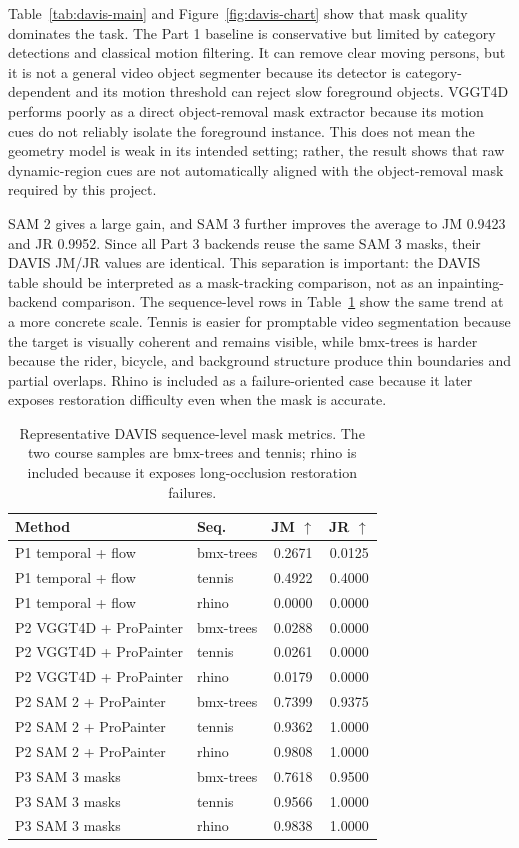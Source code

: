 \documentclass[10pt,twocolumn,letterpaper]{article}
\begin{document}
Table~\ref{tab:davis-main} and Figure~\ref{fig:davis-chart} show that mask quality dominates the task. The Part 1 baseline is conservative but limited by category detections and classical motion filtering. It can remove clear moving persons, but it is not a general video object segmenter because its detector is category-dependent and its motion threshold can reject slow foreground objects. VGGT4D performs poorly as a direct object-removal mask extractor because its motion cues do not reliably isolate the foreground instance. This does not mean the geometry model is weak in its intended setting; rather, the result shows that raw dynamic-region cues are not automatically aligned with the object-removal mask required by this project.

SAM 2 gives a large gain, and SAM 3 further improves the average to JM 0.9423 and JR 0.9952. Since all Part 3 backends reuse the same SAM 3 masks, their DAVIS JM/JR values are identical. This separation is important: the DAVIS table should be interpreted as a mask-tracking comparison, not as an inpainting-backend comparison. The sequence-level rows in Table~\ref{tab:sample-metrics} show the same trend at a more concrete scale. Tennis is easier for promptable video segmentation because the target is visually coherent and remains visible, while bmx-trees is harder because the rider, bicycle, and background structure produce thin boundaries and partial overlaps. Rhino is included as a failure-oriented case because it later exposes restoration difficulty even when the mask is accurate.

\begin{table}[t]
\centering
\scriptsize
\setlength{\tabcolsep}{3pt}
\caption{Representative DAVIS sequence-level mask metrics. The two course samples are bmx-trees and tennis; rhino is included because it exposes long-occlusion restoration failures.}
\label{tab:sample-metrics}
\begin{tabular}{llcc}
\toprule
Method & Seq. & JM $\uparrow$ & JR $\uparrow$ \\
\midrule
P1 temporal + flow & bmx-trees & 0.2671 & 0.0125 \\
P1 temporal + flow & tennis & 0.4922 & 0.4000 \\
P1 temporal + flow & rhino & 0.0000 & 0.0000 \\
P2 VGGT4D + ProPainter & bmx-trees & 0.0288 & 0.0000 \\
P2 VGGT4D + ProPainter & tennis & 0.0261 & 0.0000 \\
P2 VGGT4D + ProPainter & rhino & 0.0179 & 0.0000 \\
P2 SAM 2 + ProPainter & bmx-trees & 0.7399 & 0.9375 \\
P2 SAM 2 + ProPainter & tennis & 0.9362 & 1.0000 \\
P2 SAM 2 + ProPainter & rhino & 0.9808 & 1.0000 \\
P3 SAM 3 masks & bmx-trees & 0.7618 & 0.9500 \\
P3 SAM 3 masks & tennis & 0.9566 & 1.0000 \\
P3 SAM 3 masks & rhino & 0.9838 & 1.0000 \\
\bottomrule
\end{tabular}
\end{table}
\end{document}
